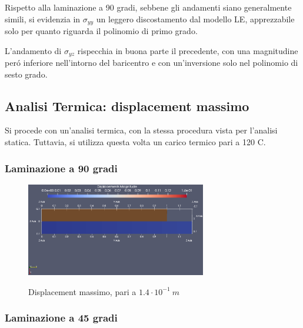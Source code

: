 \documentclass{article}
\begin{document}
            Rispetto alla laminazione a 90 gradi, sebbene gli andamenti siano generalmente simili, si evidenzia in 
            $\sigma_{yy}$ un leggero discostamento dal modello LE, apprezzabile solo per quanto riguarda il polinomio di primo grado.

            L'andamento di $\sigma_{yz}$ rispecchia in buona parte il precedente, con una magnitudine peró inferiore nell'intorno
            del baricentro e con un'inversione solo nel polinomio di sesto grado.

            \clearpage


            \subsection{Analisi Termica: displacement massimo \label{displacement_massimo_thermal}}

            Si procede con un'analisi termica, con la stessa procedura vista per l'analisi statica. Tuttavia,
            si utilizza questa volta un carico termico pari a 120 C. 

            \subsubsection{Laminazione a 90 gradi \label{displacement_massimo_90_thermal}}

            \begin{figure}[h!]
                 \label{fig:displacement_90_thermal}
                \centering
                \includegraphics[width=0.7\textwidth]{MUL2/Esercitazione3/MUL2_FEM/OUTPUT/static/Displacement_Z/displacement_thermal_90.eps}
                \caption{Displacement massimo, pari a $1.4 \cdot 10^{-1} \ m$}
            \end{figure}


            \subsubsection{Laminazione a 45 gradi \label{displacement_massimo_45_thermal}}
\end{document}
